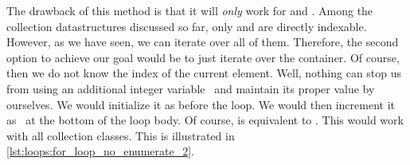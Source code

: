 The drawback of this method is that it will \emph{only} work for  and .
Among the collection datastructures discussed so far, only  and  are directly indexable.
However, as we have seen, we can iterate over all of them.
Therefore, the second option to achieve our goal would be to just  iterate over the container.
Of course, then we do not know the index of the current element.
Well, nothing can stop us from using an additional integer variable~ and maintain its proper value by ourselves.
We would initialize it as  before the loop.
We would then increment it as~ at the bottom of the loop body.
Of course,  is equivalent to \pythonIdx{+=}\pythonIdx{+}.
This would work with all collection classes.
This is illustrated in \cref{lst:loops:for_loop_no_enumerate_2}.

